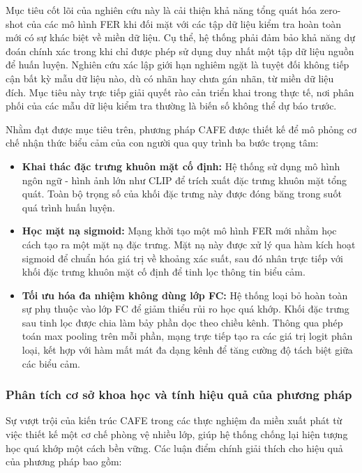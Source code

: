 Mục tiêu cốt lõi của nghiên cứu này là cải thiện khả năng tổng quát hóa zero-shot của các mô hình FER khi đối mặt với các tập dữ liệu kiểm tra hoàn toàn mới có sự khác biệt về miền dữ liệu. Cụ thể, hệ thống phải đảm bảo khả năng dự đoán chính xác trong khi chỉ được phép sử dụng duy nhất một tập dữ liệu nguồn để huấn luyện. Nghiên cứu xác lập giới hạn nghiêm ngặt là tuyệt đối không tiếp cận bất kỳ mẫu dữ liệu nào, dù có nhãn hay chưa gán nhãn, từ miền dữ liệu đích. Mục tiêu này trực tiếp giải quyết rào cản triển khai trong thực tế, nơi phân phối của các mẫu dữ liệu kiểm tra thường là biến số không thể dự báo trước.

Nhằm đạt được mục tiêu trên, phương pháp CAFE được thiết kế để mô phỏng cơ chế nhận thức biểu cảm của con người qua quy trình ba bước trọng tâm:

\begin{itemize}
    \item \textbf{Khai thác đặc trưng khuôn mặt cố định:} Hệ thống sử dụng mô hình ngôn ngữ - hình ảnh lớn như CLIP để trích xuất đặc trưng khuôn mặt tổng quát. Toàn bộ trọng số của khối đặc trưng này được đóng băng trong suốt quá trình huấn luyện.
    
    \item \textbf{Học mặt nạ sigmoid:} Mạng khởi tạo một mô hình FER mới nhằm học cách tạo ra một mặt nạ đặc trưng. Mặt nạ này được xử lý qua hàm kích hoạt sigmoid để chuẩn hóa giá trị về khoảng xác suất, sau đó nhân trực tiếp với khối đặc trưng khuôn mặt cố định để tinh lọc thông tin biểu cảm.
    
    \item \textbf{Tối ưu hóa đa nhiệm không dùng lớp FC:} Hệ thống loại bỏ hoàn toàn sự phụ thuộc vào lớp FC để giảm thiểu rủi ro học quá khớp. Khối đặc trưng sau tinh lọc được chia làm bảy phần dọc theo chiều kênh. Thông qua phép toán max pooling trên mỗi phần, mạng trực tiếp tạo ra các giá trị logit phân loại, kết hợp với hàm mất mát đa dạng kênh để tăng cường độ tách biệt giữa các biểu cảm.
\end{itemize}

\subsubsection{Phân tích cơ sở khoa học và tính hiệu quả của phương pháp}

Sự vượt trội của kiến trúc CAFE trong các thực nghiệm đa miền xuất phát từ việc thiết kế một cơ chế phòng vệ nhiều lớp, giúp hệ thống chống lại hiện tượng học quá khớp một cách bền vững. Các luận điểm chính giải thích cho hiệu quả của phương pháp bao gồm:

